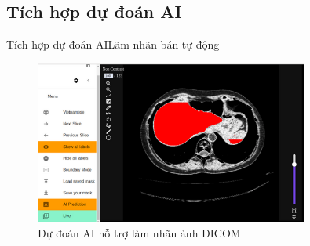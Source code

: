 \documentclass[
	10pt,                %
	aspectratio=169,     %
]{beamer}
\begin{document}
\subsection{Tích hợp dự đoán AI}

\begin{frame}{Tích hợp dự đoán AI}{Lãm nhãn bán tự động}
		\begin{figure}[h!]
				\includegraphics[width=0.8\textwidth]{Presentation_template/figures/DAT/dat_slide_labeling_with_ai.png}
				\caption{Dự đoán AI hỗ trợ làm nhãn ảnh DICOM}
		\end{figure}
\end{frame}
	
\end{document}
